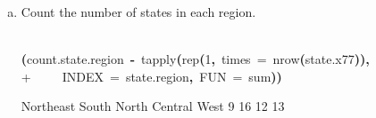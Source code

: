 \documentclass{article}
\newcommand{\hlnumber}[1]{\textcolor[rgb]{0.0823529411764706,0.0784313725490196,0.709803921568627}{#1}}%
\newcommand{\hlfunctioncall}[1]{\textcolor[rgb]{1,0,0}{#1}}%
\newcommand{\hlkeyword}[1]{\textcolor[rgb]{0,0,0}{\textbf{#1}}}%
\newcommand{\hlargument}[1]{\textcolor[rgb]{0.694117647058824,0.247058823529412,0.0196078431372549}{#1}}%
\newcommand{\hlassignement}[1]{\textcolor[rgb]{0.215686274509804,0.215686274509804,0.384313725490196}{\textbf{#1}}}%
\newcommand{\hlsymbol}[1]{\textcolor[rgb]{0,0,0}{#1}}%
\newcommand{\hlprompt}[1]{\textcolor[rgb]{0,0,0}{#1}}%
\newcommand{\hlstd}[1]{\textcolor[rgb]{0,0,0}{#1}}%
\newenvironment{Houtput}{\raggedright}{%
%
}
\begin{document}
\begin{enumerate}[(a)]
\begin{Houtput}
\begin{Schunk}
\end{Schunk}
\end{Houtput}
        \item Count the number of states in each region.
\begin{Houtput}
\hspace*{\fill}\\
\hlstd{}\ttfamily\noindent
\hlprompt{\usebox{\hlnormalsizeboxgreaterthan}{\ }}\hlkeyword{(}\hlsymbol{count.state.region}{\ }\hlassignement{\usebox{\hlnormalsizeboxlessthan}-}{\ }\hlfunctioncall{tapply}\hlkeyword{(}\hlfunctioncall{rep}\hlkeyword{(}\hlnumber{1}\hlkeyword{,}{\ }\hlargument{times}{\ }\hlargument{=}{\ }\hlfunctioncall{nrow}\hlkeyword{(}\hlsymbol{state.x77}\hlkeyword{)}\hlkeyword{)}\hlkeyword{,}\hspace*{\fill}\\
\hlstd{}\hlprompt{+{\ }}{\ }{\ }{\ }{\ }\hlargument{INDEX}{\ }\hlargument{=}{\ }\hlsymbol{state.region}\hlkeyword{,}{\ }\hlargument{FUN}{\ }\hlargument{=}{\ }\hlsymbol{sum}\hlkeyword{)}\hlkeyword{)}\mbox{}
\normalfont
\hspace*{\fill}\\
\hlstd{}\begin{Schunk}
\begin{Soutput}
    Northeast         South North Central          West 
            9            16            12            13 
\end{Soutput}


\end{Schunk}
\end{Houtput}
\end{enumerate}
\end{document}
